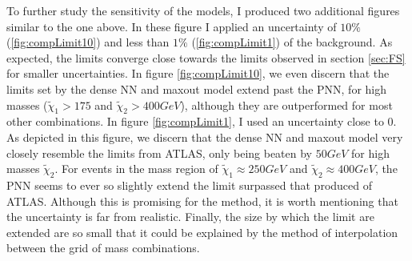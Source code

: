To further study the sensitivity of the models, I produced two additional figures similar to the one above. In these figure I applied an uncertainty of 
$10\%$ (\ref{fig:compLimit10}) and less than $1\%$ (\ref{fig:compLimit1}) of the background. As expected, the limits converge close towards the limits 
observed in section \ref{sec:FS} for smaller uncertainties. In figure \ref{fig:compLimit10}, we even discern that the limits set by the dense \ac{NN}
and maxout model extend past the \ac{PNN}, for high masses ($\tilde{\chi}_1>175$ and $\tilde{\chi}_2>400GeV$), although they are outperformed for most other combinations.
In figure \ref{fig:compLimit1}, I used an uncertainty close to 0. As depicted in this figure, we discern that the dense \ac{NN} and maxout model 
very closely resemble the limits from \ac{ATLAS}, only being beaten by $50GeV$ for high masses $\tilde{\chi}_2$. For events in the mass region of
$\tilde{\chi}_1\approx250GeV$ and $\tilde{\chi}_2\approx400GeV$, the \ac{PNN} seems to ever so slightly extend the limit surpassed that produced of \ac{ATLAS}.
Although this is promising for the method, it is worth mentioning that the uncertainty is far from realistic. Finally, the size by which the limit are extended
are so small that it could be explained by the method of interpolation between the grid of mass combinations.

